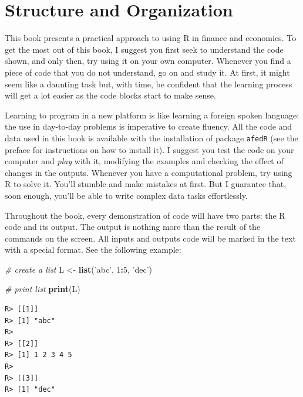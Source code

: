 \documentclass[
  12pt,
]{book}
\newenvironment{Shaded}{\begin{snugshade}}{\end{snugshade}}
\newcommand{\CommentTok}[1]{\textcolor[rgb]{0.37,0.37,0.37}{\textit{#1}}}
\newcommand{\DecValTok}[1]{\textcolor[rgb]{0.06,0.06,0.06}{#1}}
\newcommand{\KeywordTok}[1]{\textcolor[rgb]{0.27,0.27,0.27}{\textbf{#1}}}
\newcommand{\NormalTok}[1]{#1}
\newcommand{\OperatorTok}[1]{\textcolor[rgb]{0.43,0.43,0.43}{\textbf{#1}}}
\newcommand{\StringTok}[1]{\textcolor[rgb]{0.5,0.5,0.5}{#1}}
\begin{document}
\hypertarget{structure-and-organization}{%
\section{Structure and Organization}\label{structure-and-organization}}

This book presents a practical approach to using R in finance and economics. To get the most out of this book, I suggest you first seek to understand the code shown, and only then, try using it on your own computer. Whenever you find a piece of code that you do not understand, go on and study it. At first, it might seem like a daunting task but, with time, be confident that the learning process will get a lot easier as the code blocks start to make sense.

Learning to program in a new platform is like learning a foreign spoken language: the use in day-to-day problems is imperative to create fluency. All the code and data used in this book is available with the installation of package \texttt{afedR} (see the preface for instructions on how to install it). I suggest you test the code on your computer and \emph{play} with it, modifying the examples and checking the effect of changes in the outputs. Whenever you have a computational problem, try using R to solve it. You'll stumble and make mistakes at first. But I guarantee that, soon enough, you'll be able to write complex data tasks effortlessly.

Throughout the book, every demonstration of code will have two parts: the R code and its output. The output is nothing more than the result of the commands on the screen. All inputs and outputs code will be marked in the text with a special format. See the following example:

\begin{Shaded}
\begin{Highlighting}[]
\CommentTok{# create a list}
\NormalTok{L <-}\StringTok{ }\KeywordTok{list}\NormalTok{(}\StringTok{'abc'}\NormalTok{, }\DecValTok{1}\OperatorTok{:}\DecValTok{5}\NormalTok{, }\StringTok{'dec'}\NormalTok{)}

\CommentTok{# print list}
\KeywordTok{print}\NormalTok{(L)}
\end{Highlighting}
\end{Shaded}

\begin{verbatim}
R> [[1]]
R> [1] "abc"
R> 
R> [[2]]
R> [1] 1 2 3 4 5
R> 
R> [[3]]
R> [1] "dec"
\end{verbatim}
\end{document}
